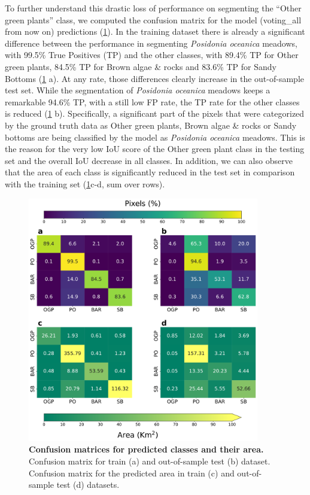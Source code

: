 To further understand this drastic loss of performance on segmenting the
``Other green plants'' class, we computed the confusion matrix for the model
(voting\_all from now on) predictions (\cref{fig:confusion_matrix}). In the
training dataset there is already a significant difference between the
performance in segmenting \textit{Posidonia oceanica} meadows, with 99.5\% True
Positives (TP) and the other classes, with 89.4\% TP for Other green plants,
84.5\% TP for Brown algae \& rocks and 83.6\% TP for Sandy Bottoms
(\cref{fig:confusion_matrix} a). At any rate, those differences clearly
increase in the out-of-sample test set. While the segmentation of
\textit{Posidonia oceanica} meadows keeps a remarkable 94.6\% TP, with a still
low FP rate, the TP rate for the other classes is reduced
(\cref{fig:confusion_matrix} b). Specifically, a significant part of the pixels
that were categorized by the ground truth data as Other green plants, Brown
algae \& rocks or Sandy bottoms are being classified by the model as
\textit{Posidonia oceanica} meadows. This is the reason for the very low IoU
score of the Other green plant class in the testing set and the overall IoU
decrease in all classes. In addition, we can also observe that the area of each
class is significantly reduced in the test set in comparison with the training
set (\cref{fig:confusion_matrix}c-d, sum over rows).

\begin{figure}[H]
    \centering
    \includegraphics[width=0.9\textwidth]{Figures/Confusion_matrix.pdf}
    \caption[Confusion matrices for predicted classes and their
        area]{\textbf{Confusion matrices for predicted classes and their area.}
        Confusion
        matrix for train (a) and out-of-sample test (b)
        dataset. Confusion matrix for the predicted area in train (c) and
        out-of-sample
        test (d) datasets.}
    \label{fig:confusion_matrix}
\end{figure}

